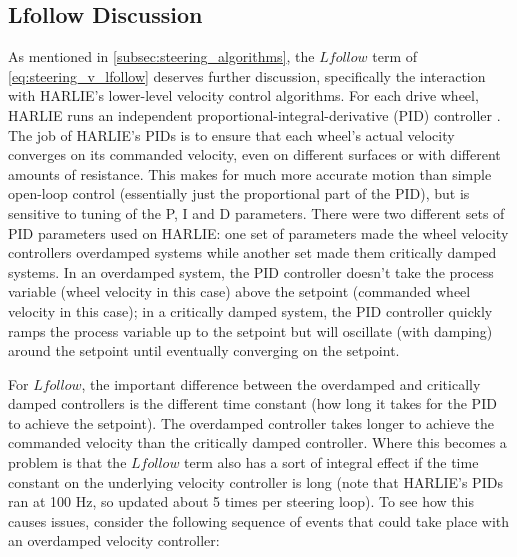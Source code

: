 \subsection{Lfollow Discussion}\label{subsec:lfollow_discussion_steering}

As mentioned in \autoref{subsec:steering_algorithms}, the $Lfollow$ term of \eqref{eq:steering_v_lfollow} deserves further discussion, specifically the interaction with HARLIE's lower-level velocity control algorithms. For each drive wheel, HARLIE runs an independent proportional-integral-derivative (PID) controller \autocite{PIDControllerWiki}. The job of HARLIE's PIDs is to ensure that each wheel's actual velocity converges on its commanded velocity, even on different surfaces or with different amounts of resistance. This makes for much more accurate motion than simple open-loop control (essentially just the proportional part of the PID), but is sensitive to tuning of the P, I and D parameters. There were two different sets of PID parameters used on HARLIE: one set of parameters made the wheel velocity controllers overdamped systems while another set made them critically damped systems. In an overdamped system, the PID controller doesn't take the process variable (wheel velocity in this case) above the setpoint (commanded wheel velocity in this case); in a critically damped system, the PID controller quickly ramps the process variable up to the setpoint but will oscillate (with damping) around the setpoint until eventually converging on the setpoint.

For $Lfollow$, the important difference between the overdamped and critically damped controllers is the different time constant (how long it takes for the PID to achieve the setpoint). The overdamped controller takes longer to achieve the commanded velocity than the critically damped controller. Where this becomes a problem is that the $Lfollow$ term also has a sort of integral effect if the time constant on the underlying velocity controller is long (note that HARLIE's PIDs ran at 100 Hz, so updated about 5 times per steering loop). To see how this causes issues, consider the following sequence of events that could take place with an overdamped velocity controller:

